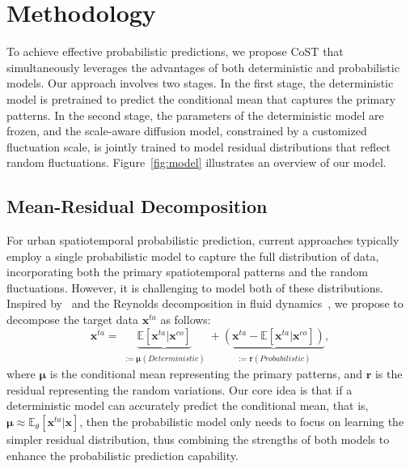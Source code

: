 

\section{Methodology}


To achieve effective probabilistic predictions, we propose CoST that simultaneously leverages the advantages of both deterministic and probabilistic models. Our approach involves two stages. In the first stage, the deterministic model is pretrained to predict the conditional mean that captures the primary patterns. In the second stage, the parameters of the deterministic model are frozen, and the scale-aware diffusion model, constrained by a customized fluctuation scale, is jointly trained to model residual distributions that reflect random fluctuations.   
Figure~\ref{fig:model} illustrates an overview of our model.


\subsection{Mean-Residual Decomposition}

For urban spatiotemporal probabilistic prediction, current approaches typically employ a single probabilistic model to capture the full distribution of data, incorporating both the primary spatiotemporal patterns and the random fluctuations. However, it is challenging to model both of these distributions. Inspired by~\cite{mardani2023residual} and the Reynolds decomposition in fluid dynamics~\cite{pope2001turbulent}, we propose to decompose the target data \(\mathbf{x}^{ta}\) as follows:
\begin{equation}
 \mathbf{x}^{ta} = \underbrace{\mathbb{E}[\mathbf{x}^{ta}|\mathbf{x}^{co}]}_{\substack{:=\boldsymbol{\mu}(Deterministic)}} + \underbrace{(\mathbf{x}^{ta}-\mathbb{E}[\mathbf{x}^{ta}|\mathbf{x}^{co}])}_{\substack{:=\mathbf{r}(Probabilistic)}},
\end{equation}
where \(\boldsymbol{\mu}\) is the conditional mean representing the primary patterns, and \(\mathbf{r}\) is the residual representing the random variations. Our core idea is that if a deterministic model can accurately predict the conditional mean, that is, \(\boldsymbol{\mu}\approx\mathbb{E}_{\theta}[\mathbf{x}^{ta}|\mathbf{x}]\), then the probabilistic model only needs to focus on learning the simpler residual distribution, thus combining the strengths of both models to enhance the probabilistic prediction capability.









